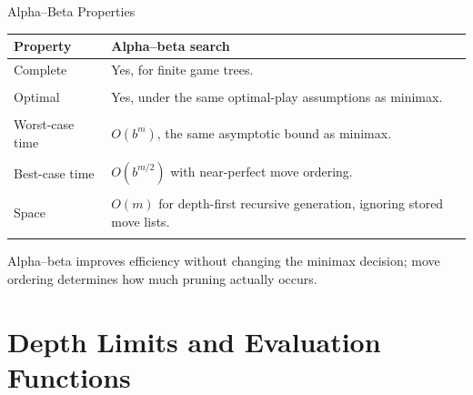 \documentclass[aspectratio=169,10pt]{beamer}
\begin{document}



\begin{frame}[shrink=18]{Alpha--Beta Properties}

  \begin{center}

    \renewcommand{\arraystretch}{1.35}

    \begin{tabular}{l|p{}}

      \textbf{Property} & \textbf{Alpha--beta search} \\ \hline

      Complete & Yes, for finite game trees. \\\\

      Optimal & Yes, under the same optimal-play assumptions as minimax. \\\\

      Worst-case time & $O(b^m)$, the same asymptotic bound as minimax. \\\\

      Best-case time & $O(b^{m/2})$ with near-perfect move ordering. \\\\

      Space & $O(m)$ for depth-first recursive generation, ignoring stored move lists. \\\\

    \end{tabular}

  \end{center}

  \begin{keyidea}

    Alpha--beta improves efficiency without changing the minimax decision; move ordering determines how much pruning actually occurs.

  \end{keyidea}

\end{frame}

\section{Depth Limits and Evaluation Functions}
\end{document}
